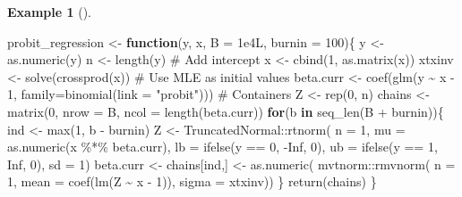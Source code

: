 \documentclass[
  11pt,
  letterpaper,
]{scrbook}
\newenvironment{Shaded}{\begin{snugshade}}{\end{snugshade}}
\newcommand{\AttributeTok}[1]{\textcolor[rgb]{0.40,0.45,0.13}{#1}}
\newcommand{\CommentTok}[1]{\textcolor[rgb]{0.37,0.37,0.37}{#1}}
\newcommand{\ConstantTok}[1]{\textcolor[rgb]{0.56,0.35,0.01}{#1}}
\newcommand{\ControlFlowTok}[1]{\textcolor[rgb]{0.00,0.23,0.31}{\textbf{#1}}}
\newcommand{\DecValTok}[1]{\textcolor[rgb]{0.68,0.00,0.00}{#1}}
\newcommand{\FloatTok}[1]{\textcolor[rgb]{0.68,0.00,0.00}{#1}}
\newcommand{\FunctionTok}[1]{\textcolor[rgb]{0.28,0.35,0.67}{#1}}
\newcommand{\NormalTok}[1]{\textcolor[rgb]{0.00,0.23,0.31}{#1}}
\newcommand{\OtherTok}[1]{\textcolor[rgb]{0.00,0.23,0.31}{#1}}
\newcommand{\SpecialCharTok}[1]{\textcolor[rgb]{0.37,0.37,0.37}{#1}}
\newcommand{\StringTok}[1]{\textcolor[rgb]{0.13,0.47,0.30}{#1}}
\theoremstyle{definition}
\theoremstyle{plain}
\theoremstyle{plain}
\theoremstyle{definition}
\theoremstyle{definition}
\newtheorem{example}{Example}[chapter]
\theoremstyle{remark}
\begin{document}
\begin{example}[]
\begin{Shaded}
\begin{Highlighting}[]
\NormalTok{probit\_regression }\OtherTok{\textless{}{-}} \ControlFlowTok{function}\NormalTok{(y, x, }\AttributeTok{B =} \FloatTok{1e4}\NormalTok{L, }\AttributeTok{burnin =} \DecValTok{100}\NormalTok{)\{}
\NormalTok{  y }\OtherTok{\textless{}{-}} \FunctionTok{as.numeric}\NormalTok{(y)}
\NormalTok{  n }\OtherTok{\textless{}{-}} \FunctionTok{length}\NormalTok{(y)}
  \CommentTok{\# Add intercept}
\NormalTok{  x }\OtherTok{\textless{}{-}} \FunctionTok{cbind}\NormalTok{(}\DecValTok{1}\NormalTok{, }\FunctionTok{as.matrix}\NormalTok{(x))}
\NormalTok{  xtxinv }\OtherTok{\textless{}{-}} \FunctionTok{solve}\NormalTok{(}\FunctionTok{crossprod}\NormalTok{(x))}
  \CommentTok{\# Use MLE as initial values}
\NormalTok{  beta.curr }\OtherTok{\textless{}{-}} \FunctionTok{coef}\NormalTok{(}\FunctionTok{glm}\NormalTok{(y }\SpecialCharTok{\textasciitilde{}}\NormalTok{ x }\SpecialCharTok{{-}} \DecValTok{1}\NormalTok{, }\AttributeTok{family=}\FunctionTok{binomial}\NormalTok{(}\AttributeTok{link =} \StringTok{"probit"}\NormalTok{)))}
  \CommentTok{\# Containers}
\NormalTok{  Z }\OtherTok{\textless{}{-}} \FunctionTok{rep}\NormalTok{(}\DecValTok{0}\NormalTok{, n)}
\NormalTok{  chains }\OtherTok{\textless{}{-}} \FunctionTok{matrix}\NormalTok{(}\DecValTok{0}\NormalTok{, }\AttributeTok{nrow =}\NormalTok{ B, }\AttributeTok{ncol =} \FunctionTok{length}\NormalTok{(beta.curr))}
  \ControlFlowTok{for}\NormalTok{(b }\ControlFlowTok{in} \FunctionTok{seq\_len}\NormalTok{(B }\SpecialCharTok{+}\NormalTok{ burnin))\{}
\NormalTok{    ind }\OtherTok{\textless{}{-}} \FunctionTok{max}\NormalTok{(}\DecValTok{1}\NormalTok{, b }\SpecialCharTok{{-}}\NormalTok{ burnin)}
\NormalTok{    Z }\OtherTok{\textless{}{-}}\NormalTok{ TruncatedNormal}\SpecialCharTok{::}\FunctionTok{rtnorm}\NormalTok{(}
      \AttributeTok{n =} \DecValTok{1}\NormalTok{,}
      \AttributeTok{mu =} \FunctionTok{as.numeric}\NormalTok{(x }\SpecialCharTok{\%*\%}\NormalTok{ beta.curr),}
      \AttributeTok{lb =} \FunctionTok{ifelse}\NormalTok{(y }\SpecialCharTok{==} \DecValTok{0}\NormalTok{, }\SpecialCharTok{{-}}\ConstantTok{Inf}\NormalTok{, }\DecValTok{0}\NormalTok{),}
      \AttributeTok{ub =} \FunctionTok{ifelse}\NormalTok{(y }\SpecialCharTok{==} \DecValTok{1}\NormalTok{, }\ConstantTok{Inf}\NormalTok{, }\DecValTok{0}\NormalTok{),}
      \AttributeTok{sd =} \DecValTok{1}\NormalTok{)}
\NormalTok{    beta.curr }\OtherTok{\textless{}{-}}\NormalTok{ chains[ind,] }\OtherTok{\textless{}{-}} \FunctionTok{as.numeric}\NormalTok{(}
\NormalTok{      mvtnorm}\SpecialCharTok{::}\FunctionTok{rmvnorm}\NormalTok{(}
        \AttributeTok{n =} \DecValTok{1}\NormalTok{,}
        \AttributeTok{mean =} \FunctionTok{coef}\NormalTok{(}\FunctionTok{lm}\NormalTok{(Z }\SpecialCharTok{\textasciitilde{}}\NormalTok{ x }\SpecialCharTok{{-}} \DecValTok{1}\NormalTok{)),}
        \AttributeTok{sigma =}\NormalTok{ xtxinv))}
\NormalTok{  \}}
\FunctionTok{return}\NormalTok{(chains)}
\NormalTok{\}}
\end{Highlighting}
\end{Shaded}

\end{example}
\end{document}
